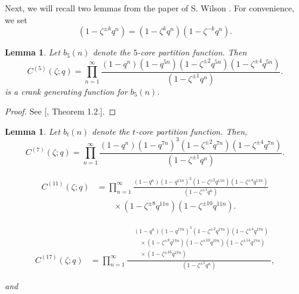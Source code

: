 \documentclass[12pt,oneside,reqno]{amsart}
\numberwithin{equation}{section}
\newtheorem{lemma}[theorem]{{\bf Lemma}}
\begin{document}
	Next, we will recall two lemmas from the paper of S. Wilson \cite{Wilson2026}.
	For convenience, we set
	\[
	(1-\zeta^{\pm k}q^n)
	=
	(1-\zeta^kq^n)(1-\zeta^{-k}q^n).
	\]
	\begin{lemma}\label{lema5}
	Let $b_5(n)$ denote the $5$-core partition function. Then
	\[
	C^{(5)}(\zeta;q)
	=
	\prod_{n=1}^{\infty}
	\frac{
		(1-q^n)(1-q^{5n})
		(1-\zeta^{\pm2}q^{5n})(1-\zeta^{\pm4}q^{5n})
	}{
		(1-\zeta^{\pm1}q^n)
	}.
	\]
		is a crank generating function for  $b_5(n)$.
	\end{lemma}
	\begin{proof}
	See [\cite{Wilson2026}, Theorem 1.2.].	
	\end{proof}
\begin{lemma}
	Let $b_t(n)$ denote the $t$-core partition function. Then,
	\begin{equation}\label{eq:C7}
		C^{(7)}(\zeta;q)
		=
		\prod_{n=1}^{\infty}
		\frac{
			(1-q^n)(1-q^{7n})^3
			(1-\zeta^{\pm2}q^{7n})
			(1-\zeta^{\pm4}q^{7n})
		}{
			(1-\zeta^{\pm1}q^n)
		}.
	\end{equation}
	
	\begin{equation}\label{eq:C11}
		\begin{aligned}
			C^{(11)}(\zeta;q)
			&=
			\prod_{n=1}^{\infty}
			\frac{
				(1-q^n)(1-q^{11n})^3
				(1-\zeta^{\pm2}q^{11n})
				(1-\zeta^{\pm4}q^{11n})
			}{
				(1-\zeta^{\pm1}q^n)
			} \\[-1mm]
			&\qquad{}\times
			(1-\zeta^{\pm8}q^{11n})
			(1-\zeta^{\pm10}q^{11n}).
		\end{aligned}
	\end{equation}
	
	\begin{equation}\label{eq:C17}
		\begin{aligned}
			C^{(17)}(\zeta;q)
			&=
			\prod_{n=1}^{\infty}
			\frac{
				\begin{aligned}
					&(1-q^n)(1-q^{17n})^5
					(1-\zeta^{\pm2}q^{17n})
					(1-\zeta^{\pm4}q^{17n})\\
					&\quad{}\times
					(1-\zeta^{\pm8}q^{17n})
					(1-\zeta^{\pm10}q^{17n})
					(1-\zeta^{\pm14}q^{17n})\\
					&\quad{}\times
					(1-\zeta^{\pm16}q^{17n})
				\end{aligned}
			}{
				(1-\zeta^{\pm1}q^n)
			},
		\end{aligned}
	\end{equation}
	
	and
	

\end{lemma}
\end{document}
